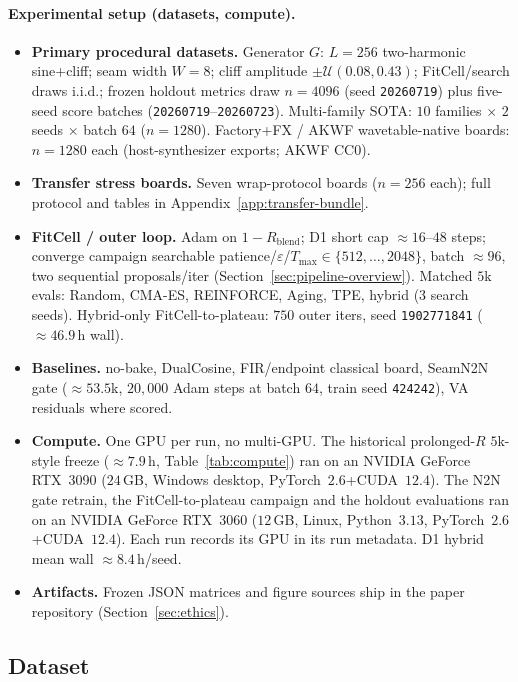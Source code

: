 \paragraph{Experimental setup (datasets, compute).}
\begin{itemize}
  \item \textbf{Primary procedural datasets.} Generator $G$: $L{=}256$ two-harmonic sine{+}cliff; seam width $W{=}8$; cliff amplitude $\pm\mathcal{U}(0.08,0.43)$; FitCell/search draws i.i.d.; frozen holdout metrics draw $n{=}4096$ (seed \texttt{20260719}) plus five-seed score batches (\texttt{20260719}--\texttt{20260723}).
    Multi-family SOTA: $10$ families $\times$ $2$ seeds $\times$ batch $64$ ($n{=}1280$).
    Factory+FX / AKWF wavetable-native boards: $n{=}1280$ each (host-synthesizer exports; AKWF CC0).
  \item \textbf{Transfer stress boards.} Seven wrap-protocol boards ($n{=}256$ each); full protocol and tables in Appendix~\ref{app:transfer-bundle}.
  \item \textbf{FitCell / outer loop.} Adam on $1-R_{\mathrm{blend}}$; D1 short cap ${\approx}16$--$48$ steps; converge campaign searchable patience/$\varepsilon$/$T_{\max}\!\in\!\{512,\ldots,2048\}$, batch ${\approx}96$, two sequential proposals/iter (Section~\ref{sec:pipeline-overview}).
    Matched $5$k evals: Random, CMA-ES, REINFORCE, Aging, TPE, hybrid (3 search seeds).
    Hybrid-only FitCell-to-plateau: $750$ outer iters, seed \texttt{1902771841} (${\approx}46.9$\,h wall).
  \item \textbf{Baselines.} no-bake, DualCosine, FIR/endpoint classical board, SeamN2N gate (${\approx}53.5$k, $20{,}000$ Adam steps at batch $64$, train seed \texttt{424242}), VA residuals where scored.
  \item \textbf{Compute.} One GPU per run, no multi-GPU. The historical prolonged-$R$ $5$k-style freeze (${\approx}7.9$\,h, Table~\ref{tab:compute}) ran on an NVIDIA GeForce RTX~3090 ($24$\,GB, Windows desktop, PyTorch~$2.6$+CUDA~$12.4$). The N2N gate retrain, the FitCell-to-plateau campaign and the holdout evaluations ran on an NVIDIA GeForce RTX~3060 ($12$\,GB, Linux, Python~$3.13$, PyTorch~$2.6$+CUDA~$12.4$). Each run records its GPU in its run metadata. D1 hybrid mean wall ${\approx}8.4$\,h/seed.
  \item \textbf{Artifacts.} Frozen JSON matrices and figure sources ship in the paper repository (Section~\ref{sec:ethics}).
\end{itemize}

\subsection{Dataset}
\label{sec:dataset}

